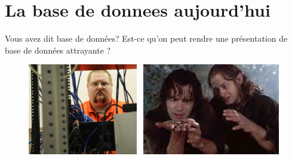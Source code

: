 \documentclass[newPxFont]{beamer}
\begin{document}
\section{La base de donnees aujourd'hui}
\begin{frame}[c]{Vous avez dit base de données?}
\vspace{-1cm}
Est-ce qu'on peut rendre une présentation de base de données attrayante ?
\begin{figure}
	\centering
	\includegraphics[height=4cm]{img/sexyadmin}~
  \includegraphics[height=4cm]{img/lordofthering}
\end{figure}
\end{frame}
\end{document}
